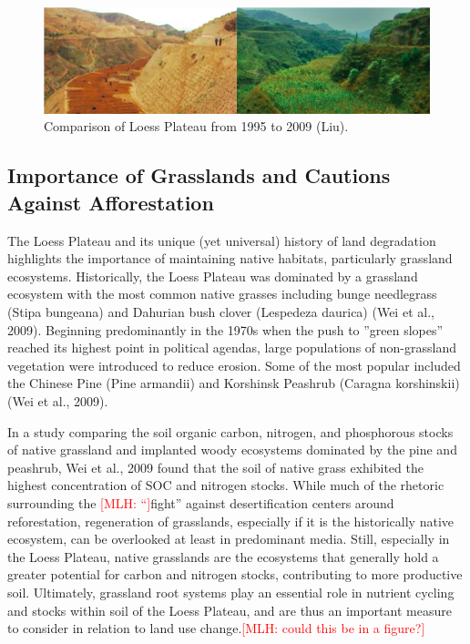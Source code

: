 \documentclass{book}\usepackage{knitr}
\newcommand{\red}[1]{\textcolor{red}{[MLH: #1]}}
\begin{document}
{\begin{figure}
\includegraphics[width=\linewidth]{images/land-use/Loess-Comparison.png}
\caption{Comparison of Loess Plateau from 1995 to 2009 (Liu).}
\label{fig:Loess-Comparison}
\end{figure}

\subsection{Importance of Grasslands and Cautions Against Afforestation}
The Loess Plateau and its unique (yet universal) history of land degradation highlights the importance of maintaining native habitats, particularly grassland ecosystems. Historically, the Loess Plateau was dominated by a grassland ecosystem with the most common native grasses including bunge needlegrass (Stipa bungeana) and Dahurian bush clover (Lespedeza daurica) (Wei et al., 2009). Beginning predominantly in the 1970s when the push to ''green slopes'' reached its highest point in political agendas, large populations of non-grassland vegetation were introduced to reduce erosion. Some of the most popular included the Chinese Pine (Pine armandii)  and Korshinsk Peashrub (Caragna korshinskii) (Wei et al., 2009).

In a study comparing the soil organic carbon, nitrogen, and phosphorous stocks of native grassland and implanted woody ecosystems dominated by the pine and peashrub, Wei et al., 2009 found that the soil of native grass exhibited the highest concentration of SOC and nitrogen stocks. While much of the rhetoric surrounding the \red{“}fight” against desertification centers around reforestation, regeneration of grasslands, especially if it is the historically native ecosystem, can be overlooked at least in predominant media. Still, especially in the Loess Plateau, native grasslands are the ecosystems that generally hold a greater potential for carbon and nitrogen stocks, contributing to more productive soil. Ultimately, grassland root systems play an essential role in nutrient cycling and stocks within soil of the Loess Plateau, and are thus an important measure to consider in relation to land use change.\red{could this be in a figure?}

}
\end{document}
